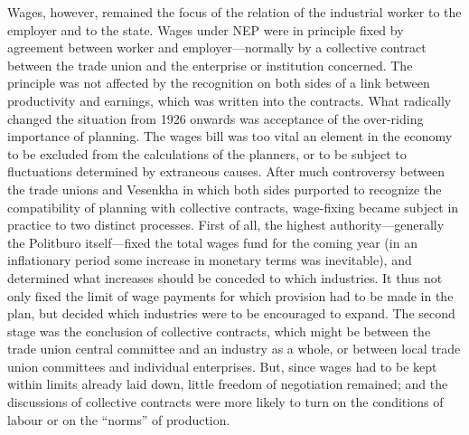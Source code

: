 Wages, however, remained the focus of the relation of the industrial worker to the employer and to the state. Wages under NEP were in principle fixed by agreement between worker and employer---normally by a collective contract between the trade union and the enterprise or institution concerned. The principle was not affected by the recognition on both sides of a link between productivity and earnings, which was written into the contracts. What radically changed the situation from 1926 onwards was acceptance of the over-riding importance of planning. The wages bill was too vital an element in the economy to be excluded from the calculations of the planners, or to be subject to fluctuations determined by extraneous causes. After much controversy between the trade unions and Vesenkha in which both sides purported to recognize the compatibility of planning with collective contracts, wage-fixing became subject in practice to two distinct processes. First of all, the highest authority---generally the Politburo itself---fixed the total wages fund for the coming year (in an inflationary period some increase in monetary terms was inevitable), and determined what increases should be conceded to which industries. It thus not only fixed the limit of wage payments for which provision had to be made in the plan, but decided which industries were to be encouraged to expand. The second stage was the conclusion of collective contracts, which might be between the trade union central committee and an industry as a whole, or between local trade union committees and individual enterprises. But, since wages had to be kept within limits already laid down, little freedom of negotiation remained; and the discussions of collective contracts were more likely to turn on the conditions of labour or on the ``norms'' of production. 

